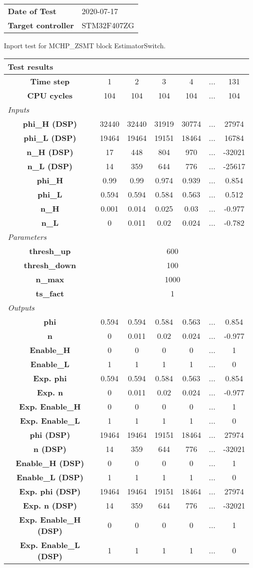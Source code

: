 \begin{tabular}{l l}
\textbf{Date of Test} & 2020-07-17 \tabularnewline
\textbf{Target controller} & STM32F407ZG \tabularnewline
\end{tabular}
\vspace{1ex}
Inport test for MCHP_ZSMT block EstimatorSwitch.

\vspace{1em}
\begin{tabularx}{\textwidth}{|c|c|c|c|c|>{\centering\arraybackslash}X|c|}
\hline
\multicolumn{7}{|l|}{\cellcolor[gray]{0.8}\textbf{Test results}} \tabularnewline \hline
\textbf{Time step} & 1 & 2 & 3 & 4 & ... & 131 \tabularnewline \hline
\textbf{CPU cycles} & 104 & 104 & 104 & 104 & ... & 104 \tabularnewline \hline
\multicolumn{7}{|l|}{\cellcolor[gray]{0.9}\textit{Inputs}} \tabularnewline \hline
\textbf{phi\_H (DSP)} & 32440 & 32440 & 31919 & 30774 & ... & 27974 \tabularnewline \hline
\textbf{phi\_L (DSP)} & 19464 & 19464 & 19151 & 18464 & ... & 16784 \tabularnewline \hline
\textbf{n\_H (DSP)} & 17 & 448 & 804 & 970 & ... & -32021 \tabularnewline \hline
\textbf{n\_L (DSP)} & 14 & 359 & 644 & 776 & ... & -25617 \tabularnewline \hline
\textbf{phi\_H} & 0.99 & 0.99 & 0.974 & 0.939 & ... & 0.854 \tabularnewline \hline
\textbf{phi\_L} & 0.594 & 0.594 & 0.584 & 0.563 & ... & 0.512 \tabularnewline \hline
\textbf{n\_H} & 0.001 & 0.014 & 0.025 & 0.03 & ... & -0.977 \tabularnewline \hline
\textbf{n\_L} & 0 & 0.011 & 0.02 & 0.024 & ... & -0.782 \tabularnewline \hline
\multicolumn{7}{|l|}{\cellcolor[gray]{0.9}\textit{Parameters}} \tabularnewline \hline
\textbf{thresh\_up} & \multicolumn{6}{c|}{600} \tabularnewline \hline
\textbf{thresh\_down} & \multicolumn{6}{c|}{100} \tabularnewline \hline
\textbf{n\_max} & \multicolumn{6}{c|}{1000} \tabularnewline \hline
\textbf{ts\_fact} & \multicolumn{6}{c|}{1} \tabularnewline \hline
\multicolumn{7}{|l|}{\cellcolor[gray]{0.9}\textit{Outputs}} \tabularnewline \hline
\textbf{phi} & 0.594 & 0.594 & 0.584 & 0.563 & ... & 0.854 \tabularnewline \hline
\textbf{n} & 0 & 0.011 & 0.02 & 0.024 & ... & -0.977 \tabularnewline \hline
\textbf{Enable\_H} & 0 & 0 & 0 & 0 & ... & 1 \tabularnewline \hline
\textbf{Enable\_L} & 1 & 1 & 1 & 1 & ... & 0 \tabularnewline \hline
\textbf{Exp. phi} & 0.594 & 0.594 & 0.584 & 0.563 & ... & 0.854 \tabularnewline \hline
\textbf{Exp. n} & 0 & 0.011 & 0.02 & 0.024 & ... & -0.977 \tabularnewline \hline
\textbf{Exp. Enable\_H} & 0 & 0 & 0 & 0 & ... & 1 \tabularnewline \hline
\textbf{Exp. Enable\_L} & 1 & 1 & 1 & 1 & ... & 0 \tabularnewline \hline
\textbf{phi (DSP)} & 19464 & 19464 & 19151 & 18464 & ... & 27974 \tabularnewline \hline
\textbf{n (DSP)} & 14 & 359 & 644 & 776 & ... & -32021 \tabularnewline \hline
\textbf{Enable\_H (DSP)} & 0 & 0 & 0 & 0 & ... & 1 \tabularnewline \hline
\textbf{Enable\_L (DSP)} & 1 & 1 & 1 & 1 & ... & 0 \tabularnewline \hline
\textbf{Exp. phi (DSP)} & 19464 & 19464 & 19151 & 18464 & ... & 27974 \tabularnewline \hline
\textbf{Exp. n (DSP)} & 14 & 359 & 644 & 776 & ... & -32021 \tabularnewline \hline
\textbf{Exp. Enable\_H (DSP)} & 0 & 0 & 0 & 0 & ... & 1 \tabularnewline \hline
\textbf{Exp. Enable\_L (DSP)} & 1 & 1 & 1 & 1 & ... & 0 \tabularnewline \hline
\end{tabularx}
